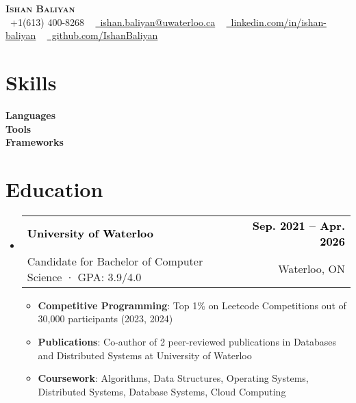\documentclass[letterpaper,11pt]{article}
\makeatletter
\newcommand\boldblack[1]{\textcolor{black}{\textbf{#1}}}
\newcommand{\resumeItem}[1]{
  \item\small{
    {#1 \vspace{-2pt}}
  }
}
\newcommand{\resumeSubheading}[4]{
  \vspace{-2pt}\item
    \begin{tabular*}{1.0\textwidth}[t]{l@{\extracolsep{\fill}}r}
      \boldblack{#1} & \boldblack{\small #2} \\
      \small#3 & \small #4 \\
    \end{tabular*}\vspace{-7pt}
}
\newcommand{\resumeSubHeadingListStart}{\begin{itemize}[leftmargin=0.0in, label={}]}
\newcommand{\resumeSubHeadingListEnd}{\end{itemize}}
\newcommand{\resumeItemListStart}{\begin{itemize}}
\newcommand{\resumeItemListEnd}{\end{itemize}\vspace{-5pt}}
\makeatother
\begin{document}
\begin{center}
    \textbf{\Huge \scshape Ishan Baliyan} \\ \vspace{10pt} \vspace{1pt}
    \small \raisebox{-0.1\height}\faPhone\ +1(613) 400-8268 ~ \href{mailto:ishanbaliyan@gmail.com}{\raisebox{-0.2\height}\faEnvelope\ ishan.baliyan@uwaterloo.ca} ~ 
    \href{https://www.linkedin.com/in/ishan-baliyan/}{\raisebox{-0.2\height}\faLinkedin\ linkedin.com/in/ishan-baliyan}  ~
    \href{https://github.com/IshanBaliyan}{\raisebox{-0.2\height}\faGithub\ github.com/IshanBaliyan}
    \vspace{-8pt}
\end{center}


\section{Skills}
 \begin{itemize}[leftmargin=0.15in, label={}]
    \small{\item{
     \textbf{Languages}\hspace{10pt}{Go · Python · Java · C++ · Ruby · SQL · JavaScript/TypeScript} \\\vspace{1pt}
     \textbf{Tools}\hspace{10pt}{Docker · Kubernetes · AWS (EC2, S3) · GCP · Redis · Linux · Git} \\ \vspace{1pt}
     \textbf{Frameworks}\hspace{10pt}{REST APIs · gRPC · Microservices · Distributed Systems · CI/CD · Multi-threading} \\
    }}
 \end{itemize}
  \vspace{-15pt}

\section{Education}
  \resumeSubHeadingListStart
    \resumeSubheading
      {University of Waterloo}{Sep. 2021 -- Apr. 2026}
      {Candidate for Bachelor of Computer Science · GPA: 3.9/4.0}{Waterloo, ON}
      \resumeItemListStart
        \resumeItem{\textbf{Competitive Programming}: Top 1\% on Leetcode Competitions out of 30,000 participants (2023, 2024)}
        \resumeItem{\textbf{Publications}: Co-author of 2 peer-reviewed publications in Databases and Distributed Systems at University of Waterloo}
        \resumeItem{\textbf{Coursework}: Algorithms, Data Structures, Operating Systems, Distributed Systems, Database Systems, Cloud Computing}
      \resumeItemListEnd
  \resumeSubHeadingListEnd
\end{document}
